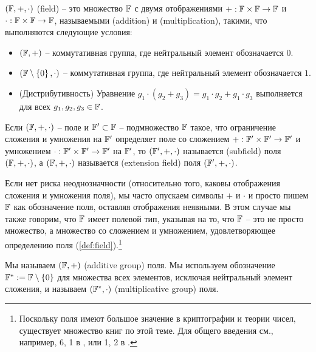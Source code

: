 \begin{definition}[Поле]\label{def:field}
 $ (\mathbb{F}, +, \cdot) $ (field) -- это множество $\mathbb{F}$ с двумя отображениями $ +: \mathbb{F} \times \mathbb{F} \to \mathbb{F} $ и $ \cdot: \mathbb{F} \times \mathbb{F} \to \mathbb{F} $, называемыми  (addition) и  (multiplication), такими, что выполняются следующие условия:
\begin{itemize}
\item $ \left (\mathbb{F}, + \right) $ -- коммутативная группа, где нейтральный элемент обозначается $ 0 $.
\item $ \left (\mathbb{F} \setminus \left \{0 \right \}, \cdot \right) $ -- коммутативная группа, где нейтральный элемент обозначается $ 1 $.
\item (Дистрибутивность) Уравнение $g_1 \cdot \left (g_2 + g_3 \right) = g_1 \cdot g_2 + g_1 \cdot g_3$ выполняется для всех $ g_1, g_2, g_3 \in \mathbb{F} $.
\end{itemize}
Если $(\mathbb{F},+,\cdot)$ -- поле и $\mathbb{F}'\subset \mathbb{F}$ -- подмножество $\mathbb{F}$ такое, что ограничение сложения и умножения на $\mathbb{F}'$ определяет поле со сложением $+: \mathbb{F}'\times \mathbb{F}' \to \mathbb{F}'$ и умножением $\cdot: \mathbb{F}'\times \mathbb{F}' \to \mathbb{F}'$ на $\mathbb{F}'$, то $(\mathbb{F}',+,\cdot)$ называется  (subfield) поля $(\mathbb{F},+,\cdot)$, а $(\mathbb{F},+,\cdot)$ называется  (extension field) поля $(\mathbb{F}',+,\cdot)$.
\end{definition}

\begin{notation} Если нет риска неоднозначности (относительно того, каковы отображения сложения и умножения поля), мы часто опускаем символы $+$ и $\cdot$ и просто пишем $\mathbb{F}$ как обозначение поля, оставляя отображения неявными. В этом случае мы также говорим, что $\mathbb{F}$ имеет полевой тип, указывая на то, что $\mathbb{F}$ -- это не просто множество, а множество со сложением и умножением, удовлетворяющее определению поля (\ref {def:field}).\footnote{Поскольку поля имеют большое значение в криптографии и теории чисел, существует множество книг по этой теме. Для общего введения см., например, \chaptname{} 6, \secname{} 1 в \cite{mignotte-1992}, или \chaptname{} 1, \secname{} 2 в \cite{nieder-1986}.}

Мы называем $(\mathbb{F},+)$  (additive group) поля. Мы используем обозначение $\mathbb{F}^*:= \mathbb{F} \setminus \left \{0 \right \}$ для множества всех элементов, исключая нейтральный элемент сложения, и называем $(\mathbb{F}^*,\cdot)$  (multiplicative group) поля.
\end{notation}

